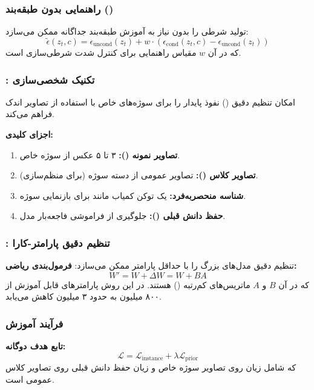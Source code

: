\subsubsection{راهنمایی بدون طبقه‌بند ()}
 تولید شرطی را بدون نیاز به آموزش طبقه‌بند جداگانه ممکن می‌سازد:
\[ \tilde{\epsilon}(z_t, c) = \epsilon_\text{uncond}(z_t) + w \cdot (\epsilon_\text{cond}(z_t, c) - \epsilon_\text{uncond}(z_t)) \]
که در آن $w$ مقیاس راهنمایی برای کنترل شدت شرطی‌سازی است.

\subsubsection{: تکنیک شخصی‌سازی}
 امکان تنظیم دقیق () نفوذ پایدار را برای سوژه‌های خاص با استفاده از تصاویر اندک فراهم می‌کند.

\textbf{اجزای کلیدی:}
\begin{enumerate}
    \item \textbf{تصاویر نمونه ():} ۳ تا ۵ عکس از سوژه خاص.
    \item \textbf{تصاویر کلاس ():} تصاویر عمومی از دسته سوژه (برای منظم‌سازی).
    \item \textbf{شناسه منحصر‌به‌فرد:} یک توکن کمیاب مانند  برای بازنمایی سوژه.
    \item \textbf{حفظ دانش قبلی ():} جلوگیری از فراموشی فاجعه‌بار مدل.
\end{enumerate}

\subsubsection{: تنظیم دقیق پارامتر-کارا}
 تنظیم دقیق مدل‌های بزرگ را با حداقل پارامتر ممکن می‌سازد:
\textbf{فرمول‌بندی ریاضی:}
\[ W' = W + \Delta W = W + BA \]
که در آن $B$ و $A$ ماتریس‌های کم‌رتبه () هستند. در این روش پارامترهای قابل آموزش از ۸۰۰ میلیون به حدود ۳ میلیون کاهش می‌یابد.

\subsubsection{فرآیند آموزش }
\textbf{تابع هدف دوگانه:}
\[ \mathcal{L} = \mathcal{L}_\text{instance} + \lambda \mathcal{L}_\text{prior} \]
که شامل زیان روی تصاویر سوژه خاص و زیان حفظ دانش قبلی روی تصاویر کلاس عمومی است.

